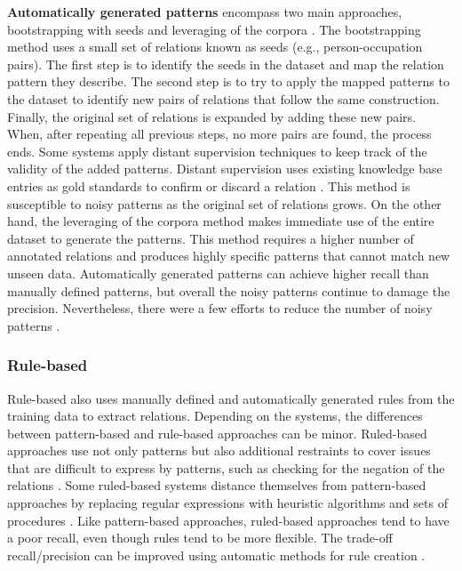 \textbf{Automatically generated patterns} encompass two main approaches, bootstrapping with seeds \citep{wang2011inference} and leveraging of the corpora \citep{liu2011graphs}. 
The bootstrapping method uses a small set of relations known as seeds (e.g., person-occupation pairs). The first step is to identify the seeds in the dataset and map the relation pattern they describe. The second step is to try to apply the mapped patterns to the dataset to identify new pairs of relations that follow the same construction. Finally, the original set of relations is expanded by adding these new pairs. When, after repeating all previous steps, no more pairs are found, the process ends. Some systems apply distant supervision techniques to keep track of the validity of the added patterns. Distant supervision uses existing knowledge base entries as gold standards to confirm or discard a relation \citep{jiang2018revisiting}. This method is susceptible to noisy patterns as the original set of relations grows.
On the other hand, the leveraging of the corpora method makes immediate use of the entire dataset to generate the patterns. This method requires a higher number of annotated relations and produces highly specific patterns that cannot match new unseen data. Automatically generated patterns can achieve higher recall than manually defined patterns, but overall the noisy patterns continue to damage the precision. Nevertheless, there were a few efforts to reduce the number of noisy patterns \citep{nguyen2010simple}. 

\subsubsection{Rule-based}

Rule-based also uses manually defined and automatically generated rules from the training data to extract relations. Depending on the systems, the differences between pattern-based and rule-based approaches can be minor. 
Ruled-based approaches use not only patterns but also additional restraints to cover issues that are difficult to express by patterns, such as checking for the negation of the relations \citep{koike2005automatic}. Some ruled-based systems distance themselves from pattern-based approaches by replacing regular expressions with heuristic algorithms and sets of procedures \citep{rinaldi2007mining}. Like pattern-based approaches, ruled-based approaches tend to have a poor recall, even though rules tend to be more flexible. The trade-off recall/precision can be improved using automatic methods for rule creation \citep{xu2012feature}.

